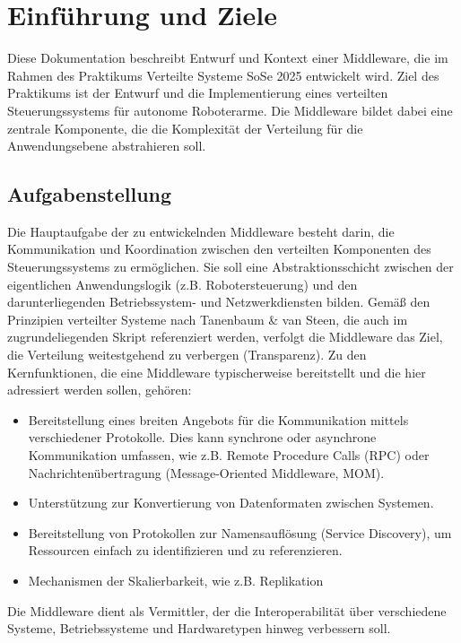 \chapter{Einführung und Ziele}

Diese Dokumentation beschreibt Entwurf und Kontext einer Middleware, die im Rahmen des Praktikums \glqq Verteilte Systeme SoSe 2025\grqq{} entwickelt wird. Ziel des Praktikums ist der Entwurf und die Implementierung eines verteilten Steuerungssystems für autonome Roboterarme. Die Middleware bildet dabei eine zentrale Komponente, die die Komplexität der Verteilung für die Anwendungsebene abstrahieren soll.


\section{Aufgabenstellung}
Die Hauptaufgabe der zu entwickelnden Middleware besteht darin, die Kommunikation und Koordination zwischen den verteilten Komponenten des Steuerungssystems zu ermöglichen. Sie soll eine Abstraktionsschicht zwischen der eigentlichen Anwendungslogik (z.B. Robotersteuerung) und den darunterliegenden Betriebssystem- und Netzwerkdiensten bilden. Gemäß den Prinzipien verteilter Systeme nach Tanenbaum \& van Steen, die auch im zugrundeliegenden Skript referenziert werden, verfolgt die Middleware das Ziel, die Verteilung weitestgehend zu verbergen (Transparenz).
Zu den Kernfunktionen, die eine Middleware typischerweise bereitstellt und die hier adressiert werden sollen, gehören:

\begin{itemize}
	\item Bereitstellung eines breiten Angebots für die Kommunikation mittels verschiedener Protokolle. Dies kann synchrone oder asynchrone Kommunikation umfassen, wie z.B. Remote Procedure Calls (RPC) oder Nachrichtenübertragung (Message-Oriented Middleware, MOM).
	\item Unterstützung zur Konvertierung von Datenformaten zwischen Systemen.
	\item Bereitstellung von Protokollen zur Namensauflösung (Service Discovery), um Ressourcen einfach zu identifizieren und zu referenzieren.
	\item Mechanismen der Skalierbarkeit, wie z.B. Replikation	
\end{itemize}

Die Middleware dient als Vermittler, der die Interoperabilität über verschiedene Systeme, Betriebssysteme und Hardwaretypen hinweg verbessern soll.


